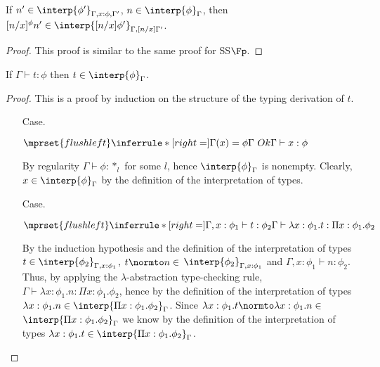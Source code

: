 \begin{lemma}
  If $n' \in \interp{\phi'}_{\Gamma,x:\phi,\Gamma'}$, $n \in \interp{\phi}_\Gamma$,
  then $[n/x]^\phi n' \in \interp{[n/x]\phi'}_{\Gamma,[n/x]\Gamma'}$.
  \label{lemma:interpretation_of_types_closed_substitution_ssfe}
\end{lemma}
\begin{proof}
  This proof is similar to the same proof for SS$\Fp$.
\end{proof}
\begin{thm}
  If $\Gamma \vdash t:\phi$ then $t \in \interp{\phi}_\Gamma$.
  \label{thm:soundness_ssfe}
\end{thm}
\begin{proof}
  This is a proof by induction on the structure of the typing derivation of $t$.
\begin{itemize}
\item[Case.]\ \\
  \begin{center}
    \begin{math}
      $$\mprset{flushleft}
      \inferrule* [right=] {
        \Gamma(x) = \phi 
        \\
        \Gamma\ Ok
      }{\Gamma \vdash x:\phi}
    \end{math}
  \end{center}
  By regularity $\Gamma \vdash \phi:*_l$ for some $l$, hence $\interp{\phi}_\Gamma$ is 
  nonempty.  Clearly, $x \in \interp{\phi}_\Gamma$ by the definition of the interpretation
  of types.
  
\item[Case.]\ \\
  \begin{center}
    \begin{math}
      $$\mprset{flushleft}
      \inferrule* [right=] {
        \Gamma,x:\phi_1 \vdash t:\phi_2
      }{\Gamma \vdash \lambda x:\phi_1.t : \Pi x:\phi_1.\phi_2}
    \end{math}
  \end{center}
  By the induction hypothesis and the definition of the interpretation of types 
  $t \in \interp{\phi_2}_{\Gamma,x:\phi_1}$, $t \normto n \in $
  $ \interp{\phi_2}_{\Gamma,x:\phi_1}$ and $\Gamma,x:\phi_1 \vdash n:\phi_2$.  Thus, by
  applying the $\lambda$-abstraction type-checking rule, 
  $\Gamma \vdash \lambda x:\phi_1.n:\Pi x:\phi_1.\phi_2$, hence by the definition of the 
  interpretation of types 
  $\lambda x:\phi_1.n \in \interp{\Pi x:\phi_1.\phi_2}_\Gamma$.  Since  
  $\lambda x:\phi_1.t \normto \lambda x:\phi_1.n \in $
  $\interp{\Pi x:\phi_1.\phi_2}_\Gamma$ we know by the definition of the interpretation of types
  $\lambda x:\phi_1.t \in \interp{\Pi x:\phi_1.\phi_2}_\Gamma$.


\end{itemize}
\end{proof}
